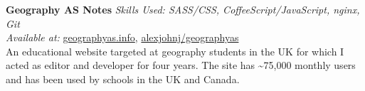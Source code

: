 \textbf{Geography AS Notes}  \newline
\textit{Skills Used: SASS/CSS, CoffeeScript/JavaScript, nginx, Git}\\
\textit{Available at:} \href{https://geographyas.info}{geographyas.info}, \href{https://github.com/\myweb/geographyas}{alexjohnj/geographyas} \\
An educational website targeted at geography students in the UK for which I
acted as editor and developer for four years. The site has
\textasciitilde{}75,000 monthly users and has been used by schools in the UK and
Canada.

